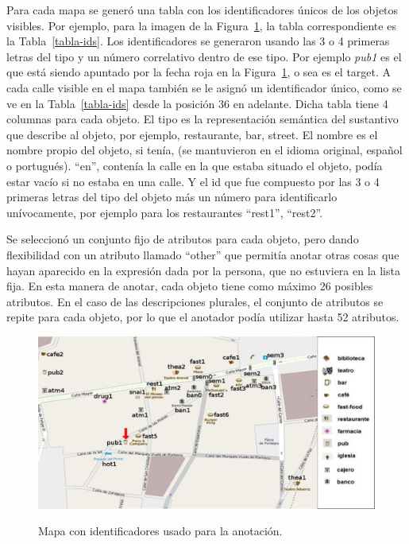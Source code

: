 Para cada mapa se gener\'o una tabla con los identificadores \'unicos de los objetos visibles. Por ejemplo, para la imagen de la Figura~\ref{mapa-con-ids}, la tabla correspondiente es la Tabla~\ref{tabla-ids}. Los identificadores se generaron usando las 3 o 4 primeras letras del tipo y un n\'umero correlativo dentro de ese tipo. Por ejemplo {\it pub1} es el que est\'a siendo apuntado por la fecha roja en la Figura~\ref{mapa-con-ids}, o sea es el target. A cada calle visible en el mapa tambi\'en se le asign\'o un identificador \'unico, como se ve en la Tabla~\ref{tabla-ids} desde la posici\'on 36 en adelante. Dicha tabla tiene 4 columnas para cada objeto. El tipo es la representaci\'on sem\'antica del sustantivo que describe al objeto, por ejemplo, restaurante, bar, street. El nombre es el nombre propio del objeto, si ten\'ia, (se mantuvieron en el idioma original, espa\~nol o portugu\'es). ``en'', conten\'ia la calle en la que estaba situado el objeto, pod\'ia estar vac\'io si no estaba en una calle. Y el id que  fue compuesto por las 3 o 4 primeras letras del tipo del objeto m\'as un n\'umero para identificarlo un\'ivocamente, por ejemplo para los restaurantes ``rest1'', ``rest2''.

Se seleccion\'o un conjunto fijo de atributos para cada objeto, pero dando flexibilidad con un atributo llamado ``other'' que permit\'ia anotar otras cosas que hayan aparecido en la expresi\'on dada por la persona, que no estuviera en la lista fija. En esta manera de anotar, cada objeto tiene como m\'aximo 26 posibles atributos.
En el caso de las descripciones plurales, el conjunto de atributos se repite para cada objeto, por lo que el anotador pod\'{i}a utilizar hasta 52 atributos.

\begin{figure}[t]
\centering
\includegraphics[width=.8\textwidth]{figures/ids.png}\\[0pt]
\caption{Mapa con identificadores usado para la anotaci\'on.}
\label{mapa-con-ids}
\end{figure}


